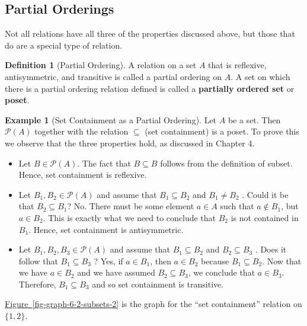 \documentclass[10pt,]{book}
\newcommand{\terminology}[1]{\textbf{#1}}
\theoremstyle{plain}
\theoremstyle{definition}
\newtheorem{definition}[theorem]{Definition}
\theoremstyle{definition}
\theoremstyle{definition}
\newtheorem{example}[theorem]{Example}
\theoremstyle{definition}
\begin{document}
\subsection[Partial Orderings]{Partial Orderings}\label{ss-partial-ordering}
Not all relations have all three of the properties discussed above, but those that do are a special type of relation.%
\begin{definition}[Partial Ordering]\label{partial-ordering}
A relation on a set \(A\) that is reflexive, antisymmetric, and transitive is called a partial ordering on \(A\). A set on which there is a partial ordering relation defined is called a \terminology{partially ordered set} or \terminology{poset}.%
\end{definition}
\begin{example}[Set Containment as a Partial Ordering]\label{ex-subset-partial-ordering}
Let \(A\) be a set. Then \(\mathcal{P}(A)\) together with the relation \(\subseteq\) (set containment) is a poset.
To prove this we observe that the three properties hold, as discussed in Chapter 4.%
\par
\leavevmode%
\begin{itemize}[label=\textbullet]
\item{}Let \(B \in  \mathcal{P}(A)\). The fact that \(B \subseteq  B\) follows from the definition of subset. Hence, set containment is reflexive.%
\item{}Let \(B_1, B_2 \in \mathcal{P}(A)\) and assume that \(B_1\subseteq  B_2\) and \(B_1\neq  B_2\) . Could it be that \(B_2\subseteq  B_1\)? No.
There must be some element \(a\in A\) such that \(a \notin B_1\), but \(a\in B_2\). This is exactly what we need to conclude that \(B_2\) is not contained in \(B_1\).  Hence, set containment is antisymmetric.%
\item{}Let \(B_1, B_2,B_3 \in \mathcal{P}(A)\) and assume that \(B_1 \subseteq  B_2\) and \(B_2 \subseteq  B_3\) . Does it follow that \(B_1 \subseteq B_3\) ? Yes, if \(a\in B_1\), then \(a\in B_2\) because \(B_1 \subseteq  B_2\). Now that we have \(a\in B_2\) and we have assumed \(B_2 \subseteq B_3\), we conclude that \(a\in B_3\).  Therefore, \(B_1\subseteq B_3\) and so set containment is transitive.%
\end{itemize}
%
\par
\hyperref[fig-graph-6-2-subsets-2]{Figure~\ref{fig-graph-6-2-subsets-2}} is the graph for the ``set containment'' relation on \(\{1,2\}\).%
\end{example}
\end{document}
